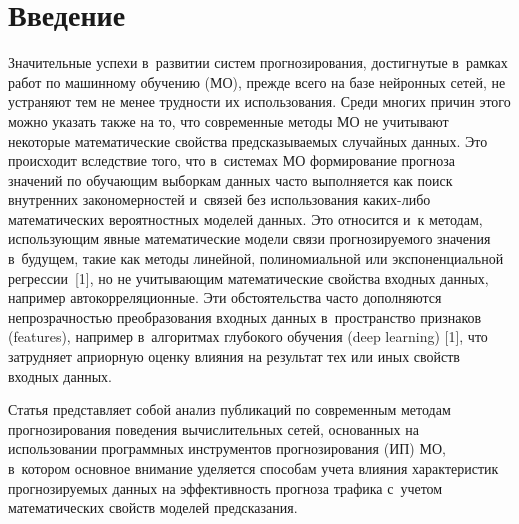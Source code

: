   
  
\vspace*{-2pt}



\thispagestyle{headings}

\begin{multicols}{2}

\label{st\stat}
  
  \section{Введение}

\vspace*{-2pt}
   
  Значительные успехи в~развитии систем прогнозирования, достигнутые 
в~рамках работ по машинному обучению (МО), прежде всего на базе 
нейронных сетей, не устраняют тем не менее трудности их использования. 
Среди многих причин этого можно указать также на то, что современные 
методы МО не учитывают некоторые математические свойства пред\-ска\-зы\-ва\-емых 
случайных данных. Это 
происходит вследствие того, что в~сис\-те\-мах МО формирование прогноза 
значений по обуча\-ющим выборкам данных час\-то выполняется как поиск 
внутренних закономерностей и~связей без использования ка\-ких-ли\-бо 
математических вероятностных моделей данных. Это относится и~к методам, 
использующим явные математические модели связи про\-гно\-зи\-ру\-емо\-го 
значения в~будущем, такие как методы линейной, полиномиальной или 
экспоненциальной регрессии~[1], но не учи\-ты\-ва\-ющим математические 
свойства вход\-ных данных, например автокорреляционные. Эти 
обстоятельства час\-то дополняются непрозрачностью преобразования 
входных данных в~пространство при\-зна\-ков (features), например 
в~алгоритмах глубокого обуче\-ния (deep learning) [1], что за\-труд\-ня\-ет 
априорную оценку влияния на результат тех или иных свойств входных 
данных. 
  
  Статья представляет собой анализ публикаций по современным методам 
прогнозирования поведения вычислительных сетей, основанных на 
использовании программных инструментов прогнозирования (ИП) МО, 
в~котором основное внимание уделяется способам учета влияния 
характеристик прогнозируемых данных на эффективность прогноза трафика 
с~учетом математических свойств моделей предсказания. 
  

\end{multicols}
